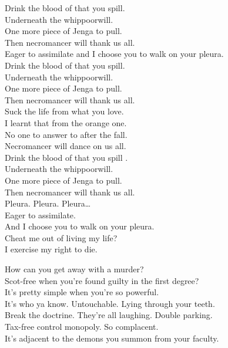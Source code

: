 Drink the blood of that you spill. \\
Underneath the whippoorwill. \\
One more piece of Jenga to pull. \\
Then necromancer will thank us all. \\

Eager to assimilate and I choose you to walk on your pleura. \\

Drink the blood of that you spill. \\
Underneath the whippoorwill. \\
One more piece of Jenga to pull. \\
Then necromancer will thank us all. \\
Suck the life from what you love. \\
I learnt that from the orange one. \\
No one to answer to after the fall. \\
Necromancer will dance on us all. \\
Drink the blood of that you spill .\\
Underneath the whippoorwill. \\
One more piece of Jenga to pull. \\
Then necromancer will thank us all. \\

Pleura. Pleura. Pleura… \\

Eager to assimilate. \\
And I choose you to walk on your pleura. \\
Cheat me out of living my life? \\
I exercise my right to die. \\




How can you get away with a murder? \\
Scot-free when you're found guilty in the first degree? \\
It's pretty simple when you're so powerful. \\
It's who ya know. Untouchable. Lying through your teeth. \\
Break the doctrine. They're all laughing. Double parking. \\
Tax-free control monopoly. So complacent. \\
It's adjacent to the demons you summon from your faculty. \\

